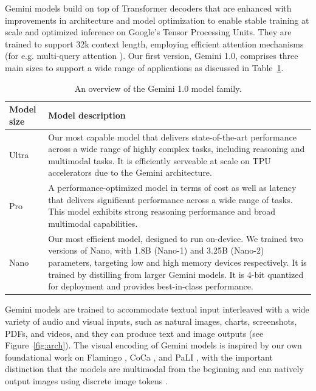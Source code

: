 Gemini models build on top of Transformer decoders \citep{vaswani2017} that are enhanced with improvements in architecture and model optimization to enable stable training at scale and optimized inference on Google's Tensor Processing Units. They are trained to support 32k context length, employing efficient attention mechanisms (for e.g. multi-query attention \citep{mqa}). Our first version, Gemini 1.0, comprises three main sizes to support a wide range of applications as discussed in Table~\ref{tab:family}.

\begin{table}[h!]
\begin{tabularx}{\textwidth}{lX}
\toprule
\textbf{Model size} & \textbf{Model description} \\
\midrule
Ultra & Our most capable model that delivers state-of-the-art performance across a wide range of highly complex tasks, including reasoning and multimodal tasks. It is efficiently serveable at scale on TPU accelerators due to the Gemini architecture. \\
\midrule
Pro & A performance-optimized model in terms of cost as well as latency that delivers significant performance across a wide range of tasks. This model exhibits strong reasoning performance and broad multimodal capabilities. \\
\midrule
Nano & Our most efficient model, designed to run on-device. We trained two versions of Nano, with 1.8B (Nano-1) and 3.25B (Nano-2) parameters,  targeting low and high memory devices respectively. It is trained by distilling from larger Gemini models. It is 4-bit quantized for deployment and provides best-in-class performance.  \\
\bottomrule
\end{tabularx}
 \caption{An overview of the Gemini 1.0 model family.}
    \label{tab:family}
\end{table}

Gemini models are trained to accommodate textual input interleaved with a wide variety of audio and visual inputs, such as natural images, charts, screenshots, PDFs, and videos, and they can produce text and image outputs (see Figure~\ref{fig:arch}). The visual encoding of Gemini models is inspired by our own foundational work on Flamingo \citep{flamingo}, CoCa \cite{coca}, and PaLI \citep{pali}, with the important distinction that the models are multimodal from the beginning and can natively output images using discrete image tokens \cite{dalle, parti}.

